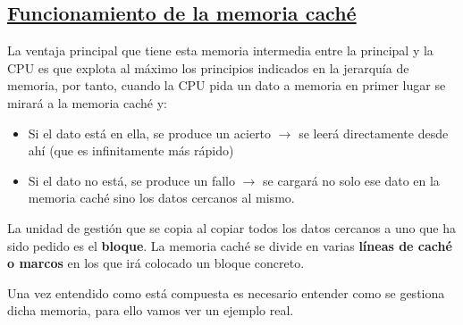 \documentclass[a4paper,10pt]{book}
\begin{document}
\subsection*{\underline{Funcionamiento de la memoria caché}}
La ventaja principal que tiene esta memoria intermedia entre la principal y la CPU es que explota al máximo los principios indicados en la jerarquía de memoria, por tanto, cuando la CPU pida un dato a memoria en primer lugar se mirará a la memoria caché y:
\begin{itemize}
\item Si el dato está en ella, se produce un acierto $\rightarrow$ se leerá directamente desde ahí (que es infinitamente más rápido)
\item Si el dato no está, se produce un fallo $\rightarrow$ se cargará no solo ese dato en la memoria caché sino los datos cercanos al mismo.
\end{itemize}
La unidad de gestión que se copia al copiar todos los datos cercanos a uno que ha sido pedido es el \textbf{bloque}. La memoria caché se divide en varias \textbf{líneas de caché o marcos} en los que irá colocado un bloque concreto.

Una vez entendido como está compuesta es necesario entender como se gestiona dicha memoria, para ello vamos ver un ejemplo real.
\end{document}
